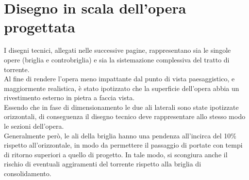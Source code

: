 \section{Disegno in scala dell'opera progettata}
I disegni tecnici, allegati nelle successive pagine, rappresentano sia le singole opere (briglia e controbriglia) e sia la sistemazione complessiva del tratto di torrente.\\
Al fine di rendere l'opera meno impattante dal punto di vista paesaggistico, e maggiormente realistica, è stato ipotizzato che la superficie dell'opera abbia un rivestimento esterno in pietra a faccia vista.\\
Essendo che in fase di dimensionamento le due ali laterali sono state ipotizzate orizzontali, di conseguenza il disegno tecnico deve rappresentare allo stesso modo le sezioni dell'opera.\\
Generalmente però, le ali della briglia hanno una pendenza all'incirca del 10\% rispetto all'orizzontale, in modo da permettere il passaggio di portate con tempi di ritorno superiori a quello di progetto. In tale modo, si scongiura anche il rischio di eventuali aggiramenti del torrente rispetto alla briglia di consolidamento.


